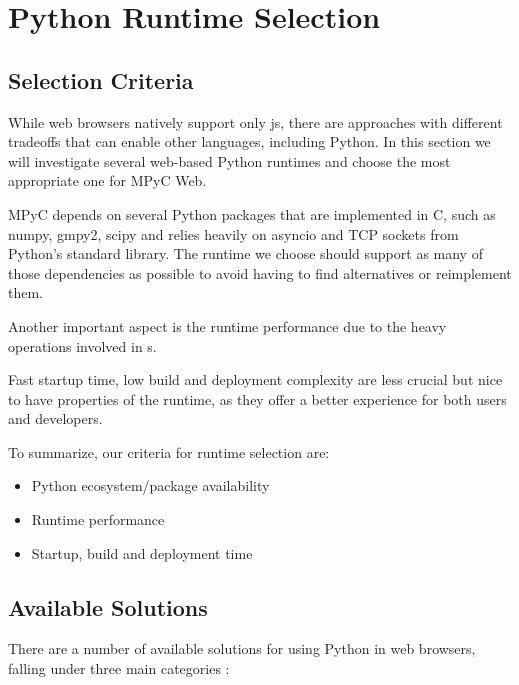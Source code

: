 \section{Python Runtime Selection}\label{thesis__090-mpyc-web.md__python-runtime-selection-1}

\subsection{Selection Criteria}\label{thesis__090-mpyc-web.md__selection-criteria-1}

While web browsers natively support only \gls{js}, there are approaches with different tradeoffs that can enable other languages, including Python. In this section we will investigate several web-based Python runtimes and choose the most appropriate one for MPyC Web.

MPyC depends on several Python packages that are implemented in C, such as numpy, gmpy2, scipy and relies heavily on asyncio and TCP sockets from Python's standard library. The runtime we choose should support as many of those dependencies as possible to avoid having to find alternatives or reimplement them.

Another important aspect is the runtime performance due to the heavy operations involved in s.

Fast startup time, low build and deployment complexity are less crucial but nice to have properties of the runtime, as they offer a better experience for both users and developers.

To summarize, our criteria for runtime selection are:

\begin{itemize}
\tightlist
\item
  Python ecosystem/package availability
\item
  Runtime performance
\item
  Startup, build and deployment time
\end{itemize}

\subsection{Available Solutions}\label{thesis__090-mpyc-web.md__available-solutions-1}

There are a number of available solutions for using Python in web browsers, falling under three main categories\autocite{pyodideIntroMozilla} \autocite{anvilPythonBrowser}:

